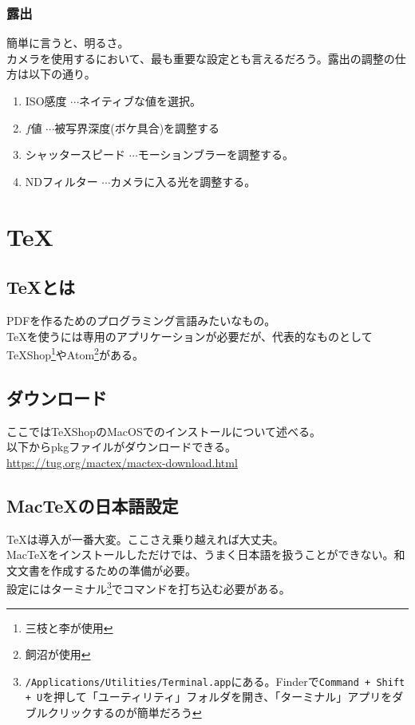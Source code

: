\documentclass[a4paper]{ltjsreport}
\begin{document}
\subsubsection{露出}
簡単に言うと、明るさ。\\
カメラを使用するにおいて、最も重要な設定とも言えるだろう。露出の調整の仕方は以下の通り。
\begin{enumerate}[{手順}1]
  \item ISO感度 $\cdots$ネイティブな値を選択。
  \item $f値$ $\cdots$被写界深度(ボケ具合)を調整する
  \item シャッタースピード $\cdots$モーションブラーを調整する。
  \item NDフィルター $\cdots$カメラに入る光を調整する。
\end{enumerate}

\section{\TeX}
\subsection{\TeX とは}
PDFを作るためのプログラミング言語みたいなもの。\\
\TeX を使うには専用のアプリケーションが必要だが、代表的なものとしてTeXShop\footnote{三枝と李が使用}やAtom\footnote{飼沼が使用}がある。
\subsection{ダウンロード}
ここではTeXShopのMacOSでのインストールについて述べる。\\
以下からpkgファイルがダウンロードできる。\\
\url{https://tug.org/mactex/mactex-download.html}
\subsection{Mac\TeX の日本語設定}
\TeX は導入が一番大変。ここさえ乗り越えれば大丈夫。\\
Mac\TeX をインストールしただけでは、うまく日本語を扱うことができない。和文文書を作成するための準備が必要。\\
設定にはターミナル\footnote{\texttt{/Applications/Utilities/Terminal.app}にある。Finderで\texttt{Command + Shift + U}を押して「ユーティリティ」フォルダを開き、「ターミナル」アプリをダブルクリックするのが簡単だろう}でコマンドを打ち込む必要がある。
\end{document}
